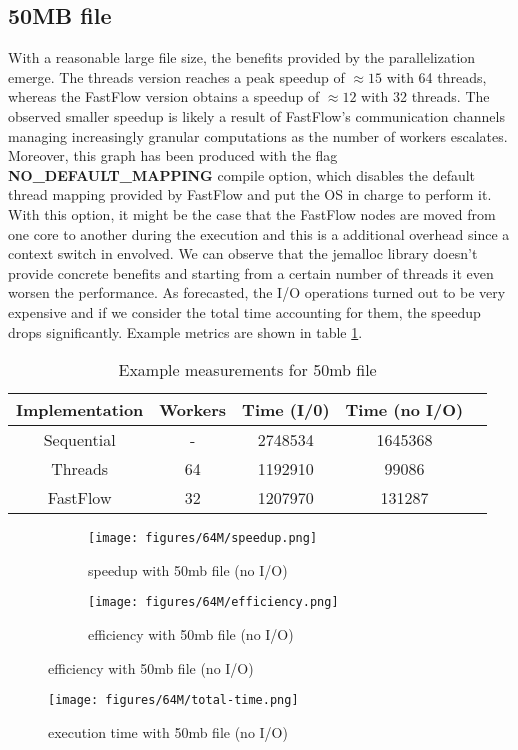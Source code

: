 \documentclass{article}
\begin{document}
\subsection{50MB file}
With a reasonable large file size, the benefits provided by the parallelization emerge.
The threads version reaches a peak speedup of $\approx 15$ with 64 threads,
whereas the FastFlow version obtains a speedup of $\approx 12$ with 32 threads.
The observed smaller speedup is likely a result of FastFlow's communication channels managing
increasingly granular computations as the number of workers escalates.
Moreover, this graph has been produced with the flag \textbf{NO\_DEFAULT\_MAPPING}
compile option, which
disables the default thread mapping provided by FastFlow and put the OS in charge to perform it.
With this option, it might be the case that the FastFlow nodes are moved from one core to another
during the execution and this is a additional overhead since a context switch in envolved.
We can observe that the jemalloc library doesn't provide concrete benefits
and starting from a certain number of threads it even worsen the performance.
As forecasted, the I/O operations turned out to be very expensive and if
we consider the total time accounting for them, the speedup drops significantly.
Example metrics are shown in table \ref{tab:measurements}.
\begin{table}[H]
    \centering
    \begin{tabular}{|c|c|c|c|c|}
        \hline
        Implementation & Workers & Time (I/0) & Time (no I/O) \\
        \hline
        Sequential     & -       & 2748534    & 1645368       \\
        Threads        & 64      & 1192910    & 99086         \\
        FastFlow       & 32      & 1207970    & 131287        \\
        \hline
    \end{tabular}
    \caption{Example measurements for 50mb file}
    \label{tab:measurements}
\end{table}

\begin{figure}[H]
    \begin{subfigure}{0.6\textwidth}
        \centering
        \texttt{[image: figures/64M/speedup.png]}
        \caption{speedup with 50mb file (no I/O)}
        \label{fig:speedup-50mb}
    \end{subfigure}
    \begin{subfigure}{0.6\textwidth}
        \centering
        \texttt{[image: figures/64M/efficiency.png]}
        \caption{efficiency with 50mb file (no I/O)}
        \label{fig:efficiency-50mb}
    \end{subfigure}
\end{figure}
\begin{figure}[H]
        \centering
        \texttt{[image: figures/64M/total-time.png]}
        \caption{execution time with 50mb file (no I/O)}
        \label{fig:total-time-50mb}
\end{figure}
\end{document}
